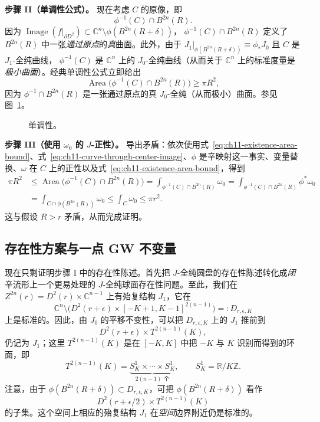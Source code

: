 \medskip
\noindent\textbf{步骤 II（单调性公式）。}
现在考虑 $C$ 的原像，即
\[
 \phi^{-1}(C)\cap B^{2n}(R).
\]
因为
$\operatorname{Image}(f|_{\partial D^2})\subset
\mathbb C^n\setminus\phi(B^{2n}(R+\delta))$，
$\phi^{-1}(C)\cap B^{2n}(R)$ 定义了 $B^{2n}(R)$ 中一张\emph{通过原点}的\emph{真}曲面。此外，由于
$J_1|_{\phi(B^{2n}(R+\delta))}\equiv\phi_*J_0$ 且 $C$ 是 $J_1$-全纯曲线，
$\phi^{-1}(C)$ 是 $\mathbb C^n$ 上的 $J_0$-全纯曲线（从而关于 $\mathbb C^n$ 上的标准度量是\emph{极小曲面}）。经典单调性公式立即给出
\[
 \operatorname{Area}\bigl(\phi^{-1}(C)\cap B^{2n}(R)\bigr)\geq\pi R^2,
\]
因为 $\phi^{-1}\cap B^{2n}(R)$ 是一张通过原点的真 $J_0$-全纯（从而极小）曲面。参见图~\ref{fig:ch11-monotonicity}。

\begin{figure}[htbp]
 \centering
 
 \caption{单调性。}
 \label{fig:ch11-monotonicity}
\end{figure}

\medskip
\noindent\textbf{步骤 III（使用 $\omega_0$ 的 $J$-正性）。}
导出矛盾：依次使用式~\eqref{eq:ch11-existence-area-bound}、式~\eqref{eq:ch11-curve-through-center-image}、$\phi$ 是辛映射这一事实、变量替换、$\omega$ 在 $C$ 上的正性以及式~\eqref{eq:ch11-existence-area-bound}，得到
\[
 \begin{aligned}
 \pi R^2
 &\leq \operatorname{Area}\bigl(\phi^{-1}(C)\cap B^{2n}(R)\bigr)
  =\int_{\phi^{-1}(C)\cap B^{2n}(R)}\omega_0
  =\int_{\phi^{-1}(C)\cap B^{2n}(R)}\phi^*\omega_0\\
 &=\int_{C\cap\phi(B^{2n}(R))}\omega_0
  \leq\int_C\omega_0\leq\pi r^2.
 \end{aligned}
\]
这与假设 $R>r$ 矛盾，从而完成证明。

\subsection{存在性方案与一点 GW 不变量}
\label{subsec:existence-scheme-one-point-gw}

现在只剩证明步骤 I 中的存在性陈述。首先把 $J$-全纯圆盘的存在性陈述转化成\emph{闭}辛流形上一个更易处理的 $J$-全纯球面存在性问题。至此，我们在
$Z^{2n}(r)=D^2(r)\times\mathbb C^{n-1}$ 上有殆复结构 $J_1$，它在
\[
 \mathbb C^n\setminus
 \bigl(D^2(r+\epsilon)\times[-K+1,K-1]^{2(n-1)}\bigr)
 =:D_{r,\epsilon,K}
\]
上是标准的。因此，由 $J_0$ 的平移不变性，可以把 $D_{r,\epsilon,K}$ 上的 $J_1$ 推前到
\[
 D^2(r+\epsilon)\times T^{2(n-1)}(K),
\]
仍记为 $J_1$；这里 $T^{2(n-1)}(K)$ 是在 $[-K,K]$ 中把 $-K$ 与 $K$ 识别而得到的环面，即
\[
 T^{2(n-1)}(K)
 =\underbrace{S_K^1\times\cdots\times S_K^1}_{2(n-1)\text{ 个}},
 \qquad S_K^1=\mathbb R/K\mathbb Z.
\]
注意，由于 $\phi(B^{2n}(R+\delta))\subset D_{r,\epsilon,K}$，可把
$\phi(B^{2n}(R+\delta))$ 看作
\[
 D^2(r+\epsilon/2)\times T^{2(n-1)}(K)
\]
的子集。这个空间上相应的殆复结构 $J_1$ 在\emph{空间}边界附近仍是标准的。

